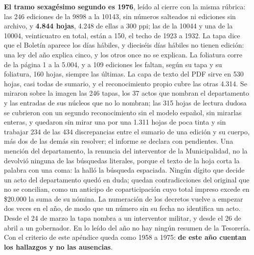 \textbf{El tramo sexagésimo segundo es 1976}, leído al cierre con la misma rúbrica: las 246 ediciones de la 9898 a la 10143, sin números salteados ni ediciones sin archivo, y \textbf{4.844 hojas}, 4.248 de ellas a 300 ppi; las de la 10044 y una de la 10004, veinticuatro en total, están a 150, el techo de 1923 a 1932. La tapa dice que el Boletín aparece los días hábiles, y dieciséis días hábiles no tienen edición: una ley del año explica cinco, y los otros once no se explican. La foliatura corre de la página 1 a la 5.004, y a 109 ediciones les faltan, según su tapa y su foliatura, 160 hojas, siempre las últimas. La capa de texto del PDF sirve en 530 hojas, casi todas de sumario, y el reconocimiento propio cubre las otras 4.314. Se miraron sobre la imagen las 246 tapas, los 37 actos que nombran el departamento y las entradas de sus núcleos que no lo nombran; las 315 hojas de lectura dudosa se cubrieron con un segundo reconocimiento sin el modelo español, sin mirarlas enteras, y quedaron sin mirar una por una 1.311 hojas de poca tinta y sin trabajar 234 de las 434 discrepancias entre el sumario de una edición y su cuerpo, más dos de las demás sin resolver; el informe se declara con pendientes. Una mención del departamento, la renuncia del interventor de la Municipalidad, no la devolvió ninguna de las búsquedas literales, porque el texto de la hoja corta la palabra con una coma: la halló la búsqueda espaciada. Ningún dígito que decide un acto del departamento quedó en duda; quedan contradicciones del original que no se concilian, como un anticipo de coparticipación cuyo total impreso excede en \$20.000 la suma de su nómina. La numeración de los decretos vuelve a empezar dos veces en el año, de modo que un número sin su fecha no identifica un acto. Desde el 24 de marzo la tapa nombra a un interventor militar, y desde el 26 de abril a un gobernador. En lo leído del año no hay ningún resumen de la Tesorería. Con el criterio de este apéndice queda como 1958 a 1975: \textbf{de este año cuentan los hallazgos y no las ausencias}.

